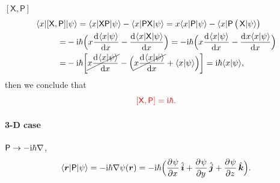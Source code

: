 \documentclass{article}
\newcommand*{\op}[1]{\mathsf{#1}}
\newcommand{\su}[1]{\vspace{-#1 pt}}
\newcommand{\spark}[1]{\textcolor{red}{#1}}
\begin{document}
\begin{example}{$[\op{X},\op{P}]$}{}\su{12}
	\begin{align*}
		\bra x[\op{X},\op{P}] & \ket\psi=\bra x\op{X}\op{P}\ket\psi-\bra x\op{P}\op{X}\ket\psi
		=x\bra x\op{P}\ket\psi-\bra x\op{P}\,\big(\,\op{X}\ket\psi\big)                                                                     \\
		=                   & -\i\hbar\Bigl(x\dv{\brkt x\psi}x-\dv{\bra x\op{X}\ket\psi}x\Bigr)
		=-\i\hbar\Bigl(x\dv{\brkt x\psi}x-\dv{x\brkt x\psi}x\Bigr)                                                                 \\
		=                   & -\i\hbar\biggl[\cancel{x\dv{\brkt x\psi}x}-\Bigl(\cancel{x\dv{\brkt x\psi}x}+\brkt x\psi\Bigr)\biggr]
		=\i\hbar\brkt x\psi,
	\end{align*}
	then we conclude that
	$$\spark{[\op{X},\op{P}]=\i\hbar.}$$
\end{example}
\paragraph{3-D case}%
$\op{P}\to-\i\hbar\nabla$,
$$\bra{\bm r}\op{P}\ket\psi=-\i\hbar\nabla\psi(\bm r)=-\i\hbar\Bigp{\pv\psi{x}\uvec{i}+\pv\psi{y}\uvec{j}+\pv\psi{z}\uvec{k}}.$$
\end{document}
